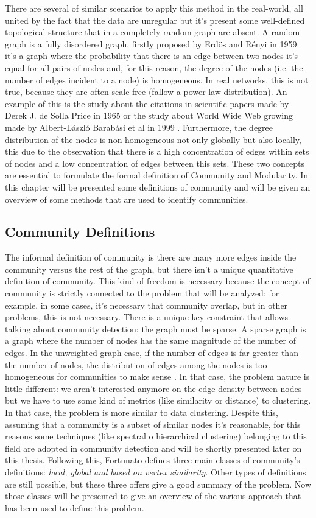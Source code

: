 There are several of similar scenarios to apply this method in the real-world, all united by the fact that the data are unregular but it's present some well-defined topological structure that in a completely random graph are absent. A random graph is a fully disordered graph, firstly proposed by Erdös and Rényi \cite{random} in 1959: it's a graph where the probability that there is an edge between two nodes it's equal for all pairs of nodes and, for this reason, the degree of the nodes (i.e. the number of edges incident to a node) is homogeneous. In real networks, this is not true, because they are often scale-free (fallow a power-law distribution). An example of this is the study about the citations in scientific papers made by Derek J. de Solla Price in 1965 \cite{dsp} or the study about World Wide Web growing made by Albert-László Barabási et al in 1999 \cite{Barab}.
Furthermore, the degree distribution of the nodes is non-homogeneous not only globally but also locally, this due to the observation that there is a high concentration of edges within sets of nodes and a low concentration of edges between this sets. These two concepts are essential to formulate the formal definition of Community and Modularity. In this chapter will be presented some definitions of community and will be given an overview of some methods that are used to identify communities.
\subsection{Community Definitions}
The informal definition of community is there are many more edges inside the community versus the rest of the graph, but there isn't a unique quantitative definition of community. This kind of freedom is necessary because the concept of community is strictly connected to the problem that will be analyzed: for example, in some cases, it's necessary that community overlap, but in other problems, this is not necessary. There is a unique key constraint that allows talking about community detection: the graph must be sparse. A sparse graph is a graph where the number of nodes has the same magnitude of the number of edges. In the unweighted graph case, if the number of edges is far greater than the number of nodes, the distribution of edges among the nodes is too homogeneous for communities to make sense \cite{fortunato}. In that case, the problem nature is little different: we aren't interested anymore on the edge density between nodes but we have to use some kind of metrics (like similarity or distance) to clustering. In that case, the problem is more similar to data clustering. Despite this, assuming that a community is a subset of similar nodes it's reasonable, for this reasons some techniques (like spectral o hierarchical clustering) belonging to this field are adopted in community detection and will be shortly presented later on this thesis.
Following this, Fortunato \cite{fortunato} defines three main classes of community's definitions: \textit{local, global and based on vertex similarity}. Other types of definitions are still possible, but these three offers give a good summary of the problem. Now those classes will be presented to give an overview of the various approach that has been used to define this problem. 

